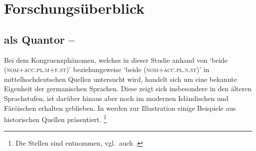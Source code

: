 \chapter{Forschungsüberblick}
\label{ch:forschungsueberblick}

\section%
	{ als Quantor -- }
\label{sec:ovwbeidequant}

Bei dem Kongruenzphänomen, welches in dieser Studie anhand von 
`beide (\textsc{nom+acc.​pl.​m+f.st})' beziehungsweise
 `beide (\textsc{nom+acc.pl.n.st})' in
mittelhochdeutschen Quellen untersucht wird, handelt sich
um eine bekannte Eigenheit der germanischen Sprachen. Diese zeigt sich
insbesondere in den älteren Sprachstufen, ist darüber hinaus aber noch im
modernen Isländischen
\autocites[283]{corbett1991}[569]{wechsler2009} und Färöischen
\autocite[225--226]{thrainsson2004} erhalten geblieben. In 
werden zur Illustration einige Beispiele aus historischen Quellen präsentiert.%
%
	\footnote{Die Stellen sind \citet[12]{askedal1973} entnommen, vgl.~auch
		\citet{hock2008,hock2009}.}

